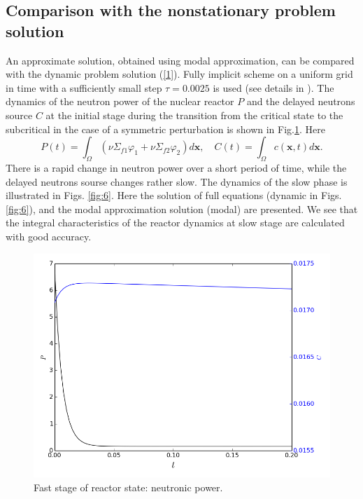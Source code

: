 \documentclass[a4paper]{jpconf}
\begin{document}
\subsection{Comparison with the nonstationary problem solution} 
An approximate solution, obtained using modal approximation, can be compared with the dynamic problem solution (\ref{1}). 
Fully implicit scheme on a uniform grid in time with a sufficiently small step $\tau = 0.0025$ is used (see details in \cite{nd-mm}).
The dynamics of the neutron power of the nuclear reactor $P$ and the delayed neutrons source $C$ at the initial stage during the transition from the critical state to the subcritical in the case of a symmetric perturbation is shown in Fig.\ref{fig:5}. 
Here 
\[
 P(t) = \int_{\Omega} (\nu\Sigma_{f1} \varphi_1 + \nu\Sigma_{f2} \varphi_2)  d \bm x,
 \quad C(t) = \int_{\Omega} c(\bm x,t) d \bm x.
\] 
There is a rapid change in neutron power over a short period of time, while the delayed neutrons sourse changes rather slow. The dynamics of the slow phase is illustrated in Figs. \ref{fig:6}. 
Here the solution of full equations (dynamic in Figs. \ref{fig:6}), and the modal approximation solution (modal) are presented. We see that the integral characteristics of the reactor dynamics at slow stage are calculated with good accuracy.

\begin{figure}[h]
  \begin{center}
    \includegraphics[width=0.5\linewidth] {14.png}
	\caption{Fast stage of reactor state: neutronic power.}
	\label{fig:5}
  \end{center}
\end{figure} 
\end{document}

